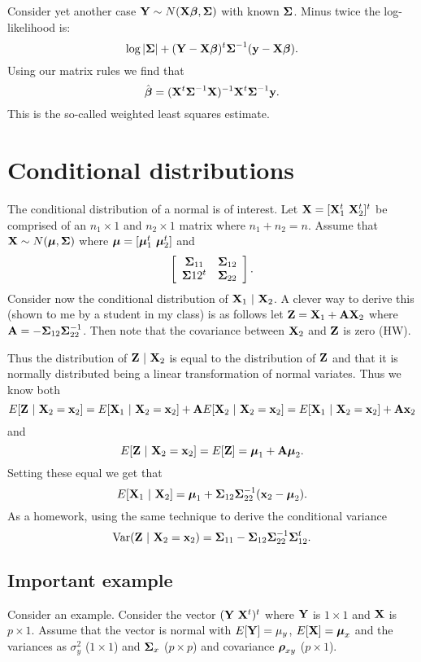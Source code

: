 Consider yet another case $\mathbf{Y} \sim N(\mathbf{X}\boldsymbol{\beta}, \boldsymbol{\Sigma})$ with known $\boldsymbol{\Sigma}$.
Minus twice the log-likelihood is:
$$
\log |\boldsymbol{\Sigma}| + (\mathbf{Y} - \mathbf{X} \boldsymbol{\beta})^t \boldsymbol{\Sigma}^{-1} (\mathbf{y} - \mathbf{X} \boldsymbol{\beta}).
$$
Using our matrix rules we find that
$$
\hat {\boldsymbol{\beta}} = (\mathbf{X}^t \boldsymbol{\Sigma}^{-1} \mathbf{X})^{-1} \mathbf{X}^t \boldsymbol{\Sigma}^{-1}\mathbf{y}. 
$$
This is the so-called weighted least squares estimate. 


\section{Conditional distributions}
The conditional distribution of a normal is of interest.
Let $\mathbf{X} = [\mathbf{X}_1^t ~ \mathbf{X}_2^t]^t$ be comprised of an $n_1 \times 1$
and $n_2 \times 1$ matrix where $n_1 + n_2  = n$. Assume that
$\mathbf{X} \sim N(\boldsymbol{\mu}, \boldsymbol{\Sigma})$ where $\boldsymbol{\mu} = [\boldsymbol{\mu}_1^t ~ \boldsymbol{\mu}_2^t]$
and 
$$
\left[
\begin{array}{cc}
\boldsymbol{\Sigma}_{11} & \boldsymbol{\Sigma}_{12} \\
\boldsymbol{\Sigma}{12}^t & \boldsymbol{\Sigma}_{22}
\end{array}
\right].
$$
Consider now the conditional distribution of $\mathbf{X}_1 ~|~ \mathbf{X}_2$. 
A clever way to derive this (shown to me by a student in my class)
is as follows let $\mathbf{Z} = \mathbf{X}_1 + \mathbf{A} \mathbf{X}_2$
where $\mathbf{A} = - \boldsymbol{\Sigma}_{12}\boldsymbol{\Sigma}_{22}^{-1}$. Then note that
the covariance between $\mathbf{X}_2$ and $\mathbf{Z}$ is zero (HW).

Thus the distribution of $\mathbf{Z} ~|~ \mathbf{X}_2$ is equal
to the distribution of $\mathbf{Z}$ and that it is normally distributed
being a linear transformation of normal variates. Thus we know both
$$
E[\mathbf{Z} ~|~ \mathbf{X}_2 = \mathbf{x}_2] = E[\mathbf{X}_1 ~|~ \mathbf{X}_2 = \mathbf{x}_2] + \mathbf{A} E[\mathbf{X}_2 ~|~ \mathbf{X}_2 = \mathbf{x}_2]
= E[\mathbf{X}_1 ~|~ \mathbf{X}_2 = \mathbf{x}_2] + \mathbf{A} \mathbf{x}_2
$$
and
$$
E[\mathbf{Z} ~|~ \mathbf{X}_2 = \mathbf{x}_2] = E[\mathbf{Z}] = \boldsymbol{\mu}_1 + \mathbf{A} \boldsymbol{\mu}_2.
$$
Setting these equal we get that
$$
E[\mathbf{X}_1 ~|~ \mathbf{X}_2] = \boldsymbol{\mu}_1 + \boldsymbol{\Sigma}_{12}\boldsymbol{\Sigma}_{22}^{-1} (\mathbf{x}_2 - \boldsymbol{\mu}_2).
$$
As a homework, using the same technique to derive the conditional variance
$$
\mbox{Var}(\mathbf{Z} ~|~ \mathbf{X}_2 = \mathbf{x}_2) = \boldsymbol{\Sigma}_{11} - \boldsymbol{\Sigma}_{12} \boldsymbol{\Sigma}_{22}^{-1} \boldsymbol{\Sigma}_{12}^t.
$$

\subsection{Important example}
Consider an example. Consider the vector 
$(\mathbf{Y} ~ \mathbf{X}^t)^t$ where $\mathbf{Y}$ is $1\times 1$ and $\mathbf{X}$ is $p\times 1$. Assume that 
the vector is normal with $E[\mathbf{Y}] = \mu_y$, $E[\mathbf{X}] = \boldsymbol{\mu}_x$ and the variances
as $\sigma^2_y$ ($1\times 1$) and $\boldsymbol{\Sigma}_x$ ($p\times p$) 
and covariance $\boldsymbol{\rho}_{xy}$ ($p \times 1$).

